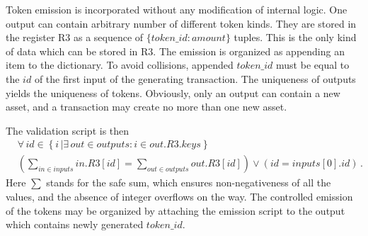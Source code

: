 Token emission is incorporated without any modification of internal logic. One output can
contain arbitrary number of different token kinds. They are stored in the
register R3 as a sequence of $\{token\_id: amount\}$ tuples. This is the only kind of data
which can be stored in R3.  The emission is organized as appending an item to
the dictionary. To avoid collisions, appended $token\_id$ must be equal to the
$id$ of the first input of the generating transaction. The uniqueness of outputs
yields the uniqueness of tokens. Obviously, only an output can contain a new asset, and a transaction
may create no more than one new asset.

 The validation script is then
\begin{eqnarray*}
    &\forall\,id\in \left\{ i\, | \exists\, out \in outputs : i\in out.R3.keys
    \right\} \nonumber\\
    &\left(\sum_{in\in inputs} in.R3[id] = \sum_{out\in
    outputs} out.R3[id] \right) \vee \left(id = inputs[0].id\right)\,.
\end{eqnarray*}
Here $\sum$ stands for the safe sum, which ensures non-negativeness of all the
values, and the absence of integer overflows on the way. The controlled emission of the
tokens may be organized by attaching the emission script to the output which contains newly generated $token\_id$.


